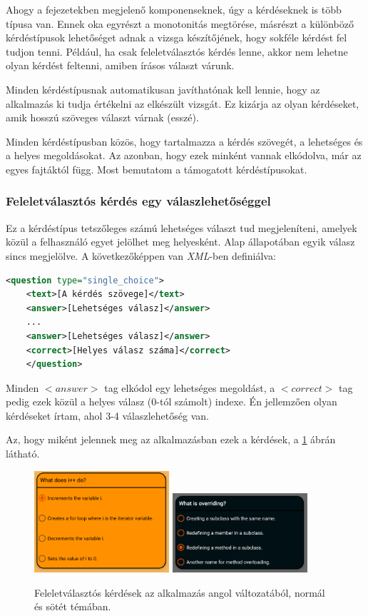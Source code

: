 \documentclass[12pt,a4paper]{article}
\newcommand{\xml}{\textit{XML}\xspace}
\begin{document}
	Ahogy a fejezetekben megjelenő komponenseknek, úgy a kérdéseknek is több típusa van. Ennek oka egyrészt a monotonitás megtörése, másrészt a különböző kérdéstípusok lehetőséget adnak a vizsga készítőjének, hogy sokféle kérdést fel tudjon tenni. Például, ha csak feleletválasztós kérdés lenne, akkor nem lehetne olyan kérdést feltenni, amiben írásos választ várunk.
	
	Minden kérdéstípusnak automatikusan javíthatónak kell lennie, hogy az alkalmazás ki tudja értékelni az elkészült vizsgát. Ez kizárja az olyan kérdéseket, amik hosszú szöveges választ várnak (esszé).
	
	Minden kérdéstípusban közös, hogy tartalmazza a kérdés szövegét, a lehetséges és a helyes megoldásokat. Az azonban, hogy ezek minként vannak elkódolva, már az egyes fajtáktól függ. Most bemutatom a támogatott kérdéstípusokat.
	
	\subsubsection{Feleletválasztós kérdés egy válaszlehetőséggel}
	
	Ez a kérdéstípus tetszőleges számú lehetséges választ tud megjeleníteni, amelyek közül a felhasználó egyet jelölhet meg helyesként. Alap állapotában egyik válasz sincs megjelölve. A következőképpen van \xml-ben definiálva:
	
	\bigskip
	\begin{lstlisting}[language=XML]
	<question type="single_choice">
	<text>[A kérdés szövege]</text>
	<answer>[Lehetséges válasz]</answer>
	...
	<answer>[Lehetséges válasz]</answer>
	<correct>[Helyes válasz száma]</correct>
	</question>
	\end{lstlisting}
	\bigskip
	
	Minden $<answer>$ tag elkódol egy lehetséges megoldást, a $<correct>$ tag pedig ezek közül a helyes válasz (0-tól számolt) indexe. Én jellemzően olyan kérdéseket írtam, ahol 3-4 válaszlehetőség van. 
	
	Az, hogy miként jelennek meg az alkalmazásban ezek a kérdések, a \ref{question_single_choice_figure} ábrán látható.
	
	\begin{figure}[h!]
		\centering
		\includegraphics[width=5cm]{question_single_choice}
		\includegraphics[width=5cm]{question_single_choice_dark}
		\caption{Feleletválasztós kérdések az alkalmazás angol változatából, normál és sötét témában.}
		\label{question_single_choice_figure}
	\end{figure}
	
\end{document}
